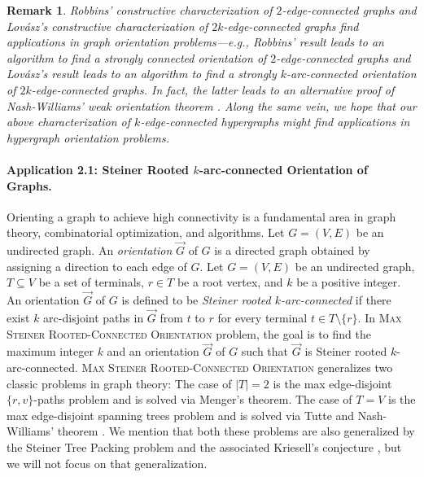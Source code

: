 \documentclass{article}
\newtheorem{remark}{Remark}[section]
\begin{document}
\begin{remark}
Robbins' constructive characterization of $2$-edge-connected graphs and Lov\'{a}sz's constructive characterization of $2k$-edge-connected graphs find applications in graph orientation problems---e.g., 
Robbins' result leads to an algorithm to find a strongly connected orientation of $2$-edge-connected graphs and 
Lov\'{a}sz's result leads to an algorithm to find a strongly $k$-arc-connected orientation of $2k$-edge-connected graphs. In fact, the latter leads to an alternative proof of Nash-Williams' \emph{weak orientation theorem} \cite{NW60}. 
Along the same vein, we hope that our above characterization of $k$-edge-connected hypergraphs might find applications in hypergraph orientation problems. 
\end{remark}


\paragraph{Application 2.1: Steiner Rooted $k$-arc-connected Orientation of Graphs.}
Orienting a graph to achieve high connectivity is a fundamental area in graph theory, combinatorial optimization, and algorithms. Let $G=(V, E)$ be an undirected graph.  An \emph{orientation} $\overrightarrow{G}$ of $G$ is a directed graph obtained by assigning a direction to each edge of $G$. 
Let $G=(V, E)$ be an undirected graph, $T\subseteq V$ be a set of terminals, $r\in T$ be a root vertex, and $k$ be a positive integer. 
An orientation $\overrightarrow{G}$ of $G$ is defined to be \emph{Steiner rooted $k$-arc-connected} if there exist $k$ arc-disjoint paths in $\overrightarrow{G}$ %
from $t$ to $r$ 
for every terminal $t\in T\setminus \{r\}$. 
In \textsc{Max Steiner Rooted-Connected Orientation} problem, the goal is to find the maximum integer $k$ and an orientation $\overrightarrow{G}$ of $G$ such that $\overrightarrow{G}$ is Steiner rooted $k$-arc-connected. 
\textsc{Max Steiner Rooted-Connected Orientation} generalizes two classic problems in graph theory: The case of $|T|=2$ is the max edge-disjoint $\{r,v\}$-paths problem and is solved via Menger's theorem. The case of $T=V$ is the max edge-disjoint spanning trees problem and is solved via Tutte and Nash-Williams' theorem \cite{Tu61, NW61}. We mention that both these problems are also generalized by the Steiner Tree Packing problem and the associated Kriesell's conjecture \cite{Kri03, JMS03, Lau07}, but we will not focus on that generalization. 
\end{document}
